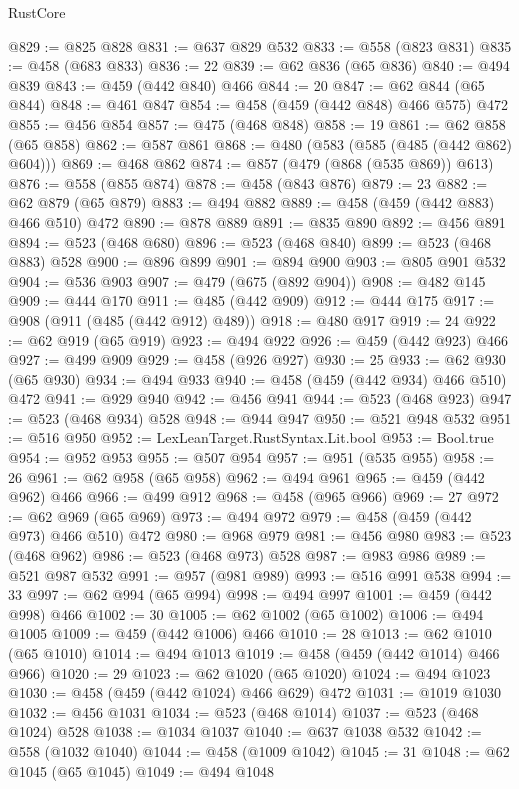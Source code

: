 \begin{lexlean}{RustCore}
\begin{coremodule}
@829 := @825 @828
@831 := @637 @829 @532
@833 := @558 (@823 @831)
@835 := @458 (@683 @833)
@836 := 22
@839 := @62 @836 (@65 @836)
@840 := @494 @839
@843 := @459 (@442 @840) @466
@844 := 20
@847 := @62 @844 (@65 @844)
@848 := @461 @847
@854 := @458 (@459 (@442 @848) @466 @575) @472
@855 := @456 @854
@857 := @475 (@468 @848)
@858 := 19
@861 := @62 @858 (@65 @858)
@862 := @587 @861
@868 := @480 (@583 (@585 (@485 (@442 @862) @604)))
@869 := @468 @862
@874 := @857 (@479 (@868 (@535 @869)) @613)
@876 := @558 (@855 @874)
@878 := @458 (@843 @876)
@879 := 23
@882 := @62 @879 (@65 @879)
@883 := @494 @882
@889 := @458 (@459 (@442 @883) @466 @510) @472
@890 := @878 @889
@891 := @835 @890
@892 := @456 @891
@894 := @523 (@468 @680)
@896 := @523 (@468 @840)
@899 := @523 (@468 @883) @528
@900 := @896 @899
@901 := @894 @900
@903 := @805 @901 @532
@904 := @536 @903
@907 := @479 (@675 (@892 @904))
@908 := @482 @145
@909 := @444 @170
@911 := @485 (@442 @909)
@912 := @444 @175
@917 := @908 (@911 (@485 (@442 @912) @489))
@918 := @480 @917
@919 := 24
@922 := @62 @919 (@65 @919)
@923 := @494 @922
@926 := @459 (@442 @923) @466
@927 := @499 @909
@929 := @458 (@926 @927)
@930 := 25
@933 := @62 @930 (@65 @930)
@934 := @494 @933
@940 := @458 (@459 (@442 @934) @466 @510) @472
@941 := @929 @940
@942 := @456 @941
@944 := @523 (@468 @923)
@947 := @523 (@468 @934) @528
@948 := @944 @947
@950 := @521 @948 @532
@951 := @516 @950
@952 := LexLeanTarget.RustSyntax.Lit.bool
@953 := Bool.true
@954 := @952 @953
@955 := @507 @954
@957 := @951 (@535 @955)
@958 := 26
@961 := @62 @958 (@65 @958)
@962 := @494 @961
@965 := @459 (@442 @962) @466
@966 := @499 @912
@968 := @458 (@965 @966)
@969 := 27
@972 := @62 @969 (@65 @969)
@973 := @494 @972
@979 := @458 (@459 (@442 @973) @466 @510) @472
@980 := @968 @979
@981 := @456 @980
@983 := @523 (@468 @962)
@986 := @523 (@468 @973) @528
@987 := @983 @986
@989 := @521 @987 @532
@991 := @957 (@981 @989)
@993 := @516 @991 @538
@994 := 33
@997 := @62 @994 (@65 @994)
@998 := @494 @997
@1001 := @459 (@442 @998) @466
@1002 := 30
@1005 := @62 @1002 (@65 @1002)
@1006 := @494 @1005
@1009 := @459 (@442 @1006) @466
@1010 := 28
@1013 := @62 @1010 (@65 @1010)
@1014 := @494 @1013
@1019 := @458 (@459 (@442 @1014) @466 @966)
@1020 := 29
@1023 := @62 @1020 (@65 @1020)
@1024 := @494 @1023
@1030 := @458 (@459 (@442 @1024) @466 @629) @472
@1031 := @1019 @1030
@1032 := @456 @1031
@1034 := @523 (@468 @1014)
@1037 := @523 (@468 @1024) @528
@1038 := @1034 @1037
@1040 := @637 @1038 @532
@1042 := @558 (@1032 @1040)
@1044 := @458 (@1009 @1042)
@1045 := 31
@1048 := @62 @1045 (@65 @1045)
@1049 := @494 @1048

\end{coremodule}
\end{lexlean}
